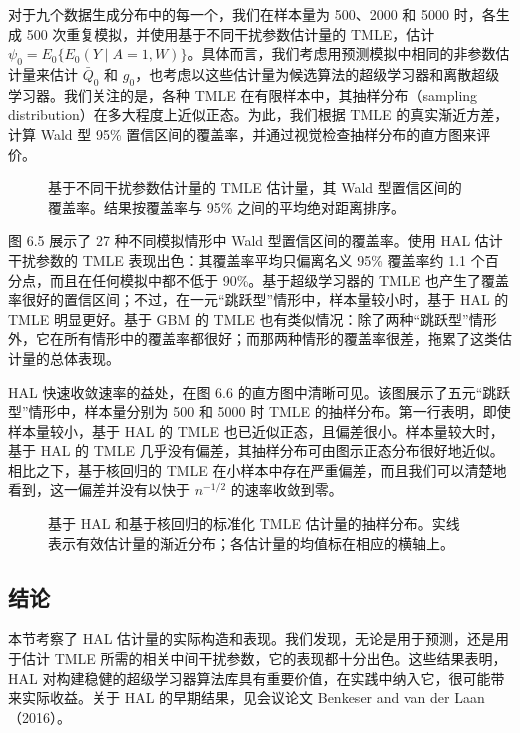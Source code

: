 对于九个数据生成分布中的每一个，我们在样本量为 500、2000 和 5000 时，各生成 500 次重复模拟，并使用基于不同干扰参数估计量的 TMLE，估计 $\psi_0=E_0\{E_0(Y\mid A=1,W)\}$。具体而言，我们考虑用预测模拟中相同的非参数估计量来估计 $\bar Q_0$ 和 $g_0$，也考虑以这些估计量为候选算法的超级学习器和离散超级学习器。我们关注的是，各种 TMLE 在有限样本中，其抽样分布（sampling distribution）在多大程度上近似正态。为此，我们根据 TMLE 的真实渐近方差，计算 Wald 型 95\% 置信区间的覆盖率，并通过视觉检查抽样分布的直方图来评价。

\begin{figure}[htbp]
 \centering
 
 \caption{基于不同干扰参数估计量的 TMLE 估计量，其 Wald 型置信区间的覆盖率。结果按覆盖率与 95\% 之间的平均绝对距离排序。}
 \label{fig:ch06-tmle-coverage}
\end{figure}

图 6.5 展示了 27 种不同模拟情形中 Wald 型置信区间的覆盖率。使用 HAL 估计干扰参数的 TMLE 表现出色：其覆盖率平均只偏离名义 95\% 覆盖率约 1.1 个百分点，而且在任何模拟中都不低于 90\%。基于超级学习器的 TMLE 也产生了覆盖率很好的置信区间；不过，在一元“跳跃型”情形中，样本量较小时，基于 HAL 的 TMLE 明显更好。基于 GBM 的 TMLE 也有类似情况：除了两种“跳跃型”情形外，它在所有情形中的覆盖率都很好；而那两种情形的覆盖率很差，拖累了这类估计量的总体表现。

HAL 快速收敛速率的益处，在图 6.6 的直方图中清晰可见。该图展示了五元“跳跃型”情形中，样本量分别为 500 和 5000 时 TMLE 的抽样分布。第一行表明，即使样本量较小，基于 HAL 的 TMLE 也已近似正态，且偏差很小。样本量较大时，基于 HAL 的 TMLE 几乎没有偏差，其抽样分布可由图示正态分布很好地近似。相比之下，基于核回归的 TMLE 在小样本中存在严重偏差，而且我们可以清楚地看到，这一偏差并没有以快于 $n^{-1/2}$ 的速率收敛到零。

\begin{figure}[htbp]
 \centering
 
 \caption{基于 HAL 和基于核回归的标准化 TMLE 估计量的抽样分布。实线表示有效估计量的渐近分布；各估计量的均值标在相应的横轴上。}
 \label{fig:ch06-tmle-distribution}
\end{figure}
\FloatBarrier

\subsection{结论}
\label{subsec:ch06-conclusion}

本节考察了 HAL 估计量的实际构造和表现。我们发现，无论是用于预测，还是用于估计 TMLE 所需的相关中间干扰参数，它的表现都十分出色。这些结果表明，HAL 对构建稳健的超级学习器算法库具有重要价值，在实践中纳入它，很可能带来实际收益。关于 HAL 的早期结果，见会议论文 Benkeser and van der Laan（2016）。

\clearpage
\endgroup
